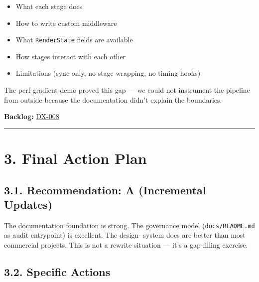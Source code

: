 

\begin{itemize}
\tightlist
\item
  What each stage does
\item
  How to write custom middleware
\item
  What \texttt{R\allowbreak{}e\allowbreak{}n\allowbreak{}d\allowbreak{}e\allowbreak{}r\allowbreak{}S\allowbreak{}t\allowbreak{}a\allowbreak{}t\allowbreak{}e} fields are available
\item
  How stages interact with each other
\item
  Limitations (sync-only, no stage wrapping, no timing hooks)
\end{itemize}

The perf-gradient demo proved this gap --- we could not instrument the pipeline from outside because the documentation didn't explain the boundaries.

\textbf{Backlog:} \href{https://github.com/flyingrobots/bijou/blob/cbd70612140e7a450d764b3c7be1c6af878b99bc/docs/method/graveyard/legacy-backlog/inbox/DX-008-render-pipeline-guide.md}{DX-008}

\begin{center}\rule{0.5\linewidth}{0.5pt}\end{center}

\section{3. Final Action Plan}\label{record-412-final-action-plan}

\subsection{3.1. Recommendation: A (Incremental Updates)}\label{record-412-recommendation-a-incremental-updates}

The documentation foundation is strong. The governance model (\texttt{d\allowbreak{}o\allowbreak{}c\allowbreak{}s\allowbreak{}/\allowbreak{}R\allowbreak{}E\allowbreak{}A\allowbreak{}D\allowbreak{}M\allowbreak{}E\allowbreak{}.\allowbreak{}m\allowbreak{}d} as audit entrypoint) is excellent. The design- system docs are better than most commercial projects. This is not a rewrite situation --- it's a gap-filling exercise.

\subsection{3.2. Specific Actions}\label{record-412-specific-actions}

